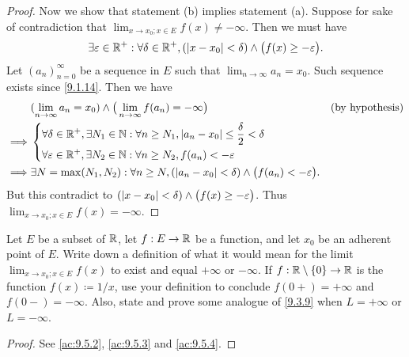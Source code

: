 \begin{proof}
  Now we show that statement (b) implies statement (a).
  Suppose for sake of contradiction that \(\lim_{x \to x_0 ; x \in E} f(x) \neq -\infty\).
  Then we must have
  \[
    \exists \varepsilon \in \mathbb{R}^+ : \forall \delta \in \mathbb{R}^+, (\left\lvert x - x_0\right\rvert < \delta) \land \big(f(x) \geq -\varepsilon\big).
  \]
  Let \((a_n)_{n = 0}^\infty\) be a sequence in \(E\) such that \(\lim_{n \to \infty} a_n = x_0\).
  Such sequence exists since \cref{9.1.14}.
  Then we have
  \begin{align*}
             & (\lim_{n \to \infty} a_n = x_0) \land \big(\lim_{n \to \infty} f(a_n) = -\infty\big)                                 &  & \text{(by hypothesis)} \\
    \implies & \begin{dcases}
                 \forall \delta \in \mathbb{R}^+, \exists N_1 \in \mathbb{N} : \forall n \geq N_1, \left\lvert a_n - x_0\right\rvert \leq \dfrac{\delta}{2} < \delta \\
                 \forall \varepsilon \in \mathbb{R}^+, \exists N_2 \in \mathbb{N} : \forall n \geq N_2, f(a_n) < -\varepsilon
               \end{dcases}                                \\
    \implies & \exists N = \max(N_1, N_2) : \forall n \geq N, (\left\lvert a_n - x_0\right\rvert < \delta) \land \big(f(a_n) < -\varepsilon\big).
  \end{align*}
  But this contradict to \((\left\lvert x - x_0\right\rvert < \delta) \land \big(f(x) \geq -\varepsilon\big)\).
  Thus \(\lim_{x \to x_0 ; x \in E} f(x) = -\infty\).
\end{proof}

\exercisesection

\begin{ex}\label{ex:9.5.1}
  Let \(E\) be a subset of \(\mathbb{R}\), let \(f : E \to \mathbb{R}\) be a function, and let \(x_0\) be an adherent point of \(E\).
  Write down a definition of what it would mean for the limit \(\lim_{x \to x_0 ; x \in E} f(x)\) to exist and equal \(+\infty\) or \(-\infty\).
  If \(f : \mathbb{R} \setminus \left\lbrace0\right\rbrace \to \mathbb{R}\) is the function \(f(x) \coloneqq 1 / x\), use your definition to conclude \(f(0+) = +\infty\) and \(f(0-) = -\infty\).
  Also, state and prove some analogue of \cref{9.3.9} when \(L = +\infty\) or \(L = -\infty\).
\end{ex}

\begin{proof}
  See \cref{ac:9.5.2}, \cref{ac:9.5.3} and \cref{ac:9.5.4}.
\end{proof}
